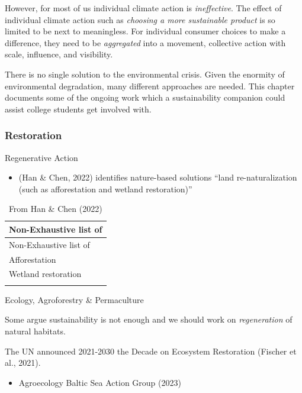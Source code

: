 \documentclass[
  letterpaper,
  DIV=11,
  numbers=noendperiod]{scrartcl}
\providecommand{\tightlist}{%
  \setlength{\itemsep}{0pt}\setlength{\parskip}{0pt}}\usepackage{longtable,booktabs,array}
\begin{document}
However, for most of us individual climate action is \emph{ineffective}.
The effect of individual climate action such as \emph{choosing a more
sustainable product} is so limited to be next to meaningless. For
individual consumer choices to make a difference, they need to be
\emph{aggregated} into a movement, collective action with scale,
influence, and visibility.

There is no single solution to the environmental crisis. Given the
enormity of environmental degradation, many different approaches are
needed. This chapter documents some of the ongoing work which a
sustainability companion could assist college students get involved
with.

\subsubsection{Restoration}\label{restoration}

Regenerative Action

\begin{itemize}
\tightlist
\item
  (Han \& Chen, 2022) identifies nature-based solutions ``land
  re-naturalization (such as afforestation and wetland restoration)''
\end{itemize}

\begin{longtable}[]{@{}l@{}}
\caption{From Han \& Chen (2022)}\tabularnewline
\toprule\noalign{}
Non-Exhaustive list of \\
\midrule\noalign{}
\endfirsthead
\toprule\noalign{}
Non-Exhaustive list of \\
\midrule\noalign{}
\endhead
\bottomrule\noalign{}
\endlastfoot
Afforestation \\
Wetland restoration \\
 \\
\end{longtable}

Ecology, Agroforestry \& Permaculture

Some argue sustainability is not enough and we should work on
\emph{regeneration} of natural habitats.

The UN announced 2021-2030 the Decade on Ecosystem Restoration (Fischer
et al., 2021).

\begin{itemize}
\tightlist
\item
  Agroecology Baltic Sea Action Group (2023)
\end{itemize}
\end{document}
